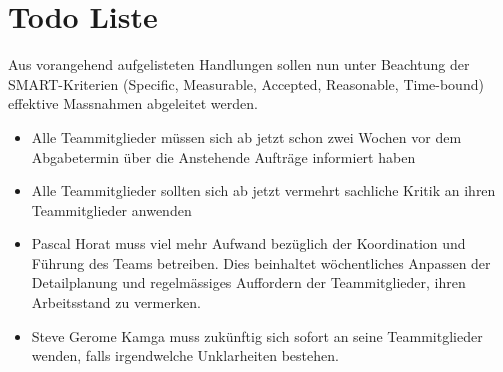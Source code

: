 
\chapter{Todo Liste}

Aus vorangehend aufgelisteten Handlungen sollen nun unter Beachtung der 
SMART-Kriterien (Specific, Measurable, Accepted, Reasonable, Time-bound) 
effektive Massnahmen abgeleitet werden. 

\begin{itemize}

\item Alle Teammitglieder müssen sich ab jetzt schon zwei Wochen vor dem Abgabetermin über die Anstehende Aufträge informiert haben
\item Alle Teammitglieder sollten sich ab jetzt vermehrt sachliche Kritik an ihren Teammitglieder anwenden  
\item Pascal Horat muss viel mehr Aufwand bezüglich der Koordination und Führung des Teams betreiben. Dies beinhaltet wöchentliches Anpassen der Detailplanung und regelmässiges Auffordern der Teammitglieder, ihren Arbeitsstand zu vermerken.
\item Steve Gerome Kamga muss zukünftig sich sofort an seine Teammitglieder wenden, falls irgendwelche Unklarheiten bestehen. 

\end{itemize}